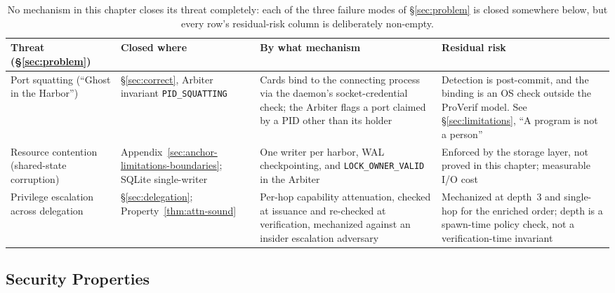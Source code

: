 \documentclass[11pt,a4paper]{article}
\theoremstyle{definition}
\begin{document}
\begin{table}[H]
\centering
\caption{No mechanism in this chapter closes its threat completely: each of the three failure modes of \S\ref{sec:problem} is closed somewhere below, but every row's residual-risk column is deliberately non-empty.}
\label{tab:threat-closure}
\small
\begin{tabularx}{\textwidth}{@{}>{\raggedright\arraybackslash}p{} >{\raggedright\arraybackslash}p{} >{\raggedright\arraybackslash}X >{\raggedright\arraybackslash}X@{}}
\toprule
\textbf{Threat (\S\ref{sec:problem})} & \textbf{Closed where} & \textbf{By what mechanism} & \textbf{Residual risk} \\
\midrule
Port squatting (``Ghost in the Harbor'') &
\S\ref{sec:correct}, Arbiter invariant \texttt{PID\allowbreak\_SQUATTING} &
Cards bind to the connecting process via the daemon's socket-credential check; the Arbiter flags a port claimed by a PID other than its holder &
Detection is post-commit, and the binding is an OS check outside the ProVerif model. See \S\ref{sec:limitations}, ``A program is not a person'' \\
\addlinespace
Resource contention (shared-state corruption) &
Appendix~\ref{sec:anchor-limitations-boundaries}; SQLite single-writer &
One writer per harbor, WAL checkpointing, and \texttt{LOCK\_OWNER\_VALID} in the Arbiter &
Enforced by the storage layer, not proved in this chapter; measurable I/O cost \\
\addlinespace
Privilege escalation across delegation &
\S\ref{sec:delegation}; Property~\ref{thm:attn-sound} &
Per-hop capability attenuation, checked at issuance and re-checked at verification, mechanized against an insider escalation adversary &
Mechanized at depth~3 and single-hop for the enriched order; depth is a spawn-time policy check, not a verification-time invariant \\
\bottomrule
\end{tabularx}
\end{table}

\subsection{Security Properties}
\end{document}

